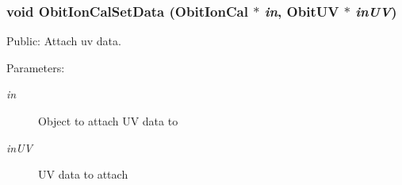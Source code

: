 \subsubsection{\setlength{\rightskip}{0pt plus 5cm}void Obit\-Ion\-Cal\-Set\-Data ({\bf Obit\-Ion\-Cal} $\ast$ {\em in}, {\bf Obit\-UV} $\ast$ {\em in\-UV})}\label{ObitIonCal_8c_a45}


Public: Attach uv data. 

\begin{Desc}
\item[Parameters:]
\begin{description}
\item[{\em in}]Object to attach UV data to \item[{\em in\-UV}]UV data to attach \end{description}
\end{Desc}
